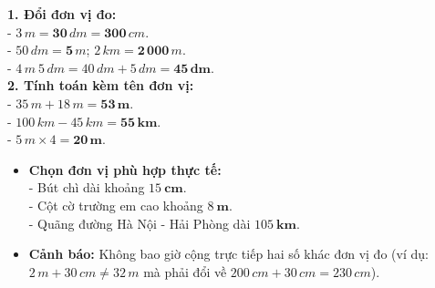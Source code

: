 \documentclass[10pt,a4paper]{article}
\begin{document}
\vspace{-1.5mm}
\noindent
\begin{minipage}[t]{0.49\textwidth}\vspace{0pt}
\begin{tcolorbox}[
  enhanced,
  colback=green!4!white,
  colframe=green!60!black,
  arc=2mm, boxrule=0.8pt,
  left=2mm, right=2mm, top=1.8mm, bottom=1.8mm,
  title={\footnotesize\bfseries\color{white}\faCheckCircle\ 4. Ví dụ đổi đơn vị \& Tính toán}
]
{\footnotesize
\textbf{1. Đổi đơn vị đo:}\\
- $3\,m = \mathbf{30}\,dm = \mathbf{300}\,cm$.\\
- $50\,dm = \mathbf{5}\,m$; \quad $2\,km = \mathbf{2\,000}\,m$.\\
- $4\,m\ 5\,dm = 40\,dm + 5\,dm = \mathbf{45\,dm}$.\\
\textbf{2. Tính toán kèm tên đơn vị:}\\
- $35\,m + 18\,m = \mathbf{53\,m}$.\\
- $100\,km - 45\,km = \mathbf{55\,km}$.\\
- $5\,m \times 4 = \mathbf{20\,m}$.
}
\end{tcolorbox}
\end{minipage}
\hfill
\begin{minipage}[t]{0.49\textwidth}\vspace{0pt}
\begin{tcolorbox}[
  enhanced,
  colback=rose!4!white,
  colframe=rose!70!black,
  arc=2mm, boxrule=0.8pt,
  left=2mm, right=2mm, top=1.8mm, bottom=1.8mm,
  title={\footnotesize\bfseries\color{white}\faExclamationTriangle\ 5. Lựa chọn đơn vị thích hợp}
]
{\footnotesize
\begin{itemize}\setlength{\itemsep}{1.5pt}\setlength{\leftskip}{-2.5mm}
  \item \textbf{Chọn đơn vị phù hợp thực tế:}\\
  - Bút chì dài khoảng $15\ \mathbf{cm}$.\\
  - Cột cờ trường em cao khoảng $8\ \mathbf{m}$.\\
  - Quãng đường Hà Nội - Hải Phòng dài $105\ \mathbf{km}$.
  \item \textbf{Cảnh báo:} Không bao giờ cộng trực tiếp hai số khác đơn vị đo (ví dụ: $2\,m + 30\,cm \neq 32\,m$ mà phải đổi về $200\,cm + 30\,cm = 230\,cm$).
\end{itemize}
}
\end{tcolorbox}
\end{minipage}
\end{document}
